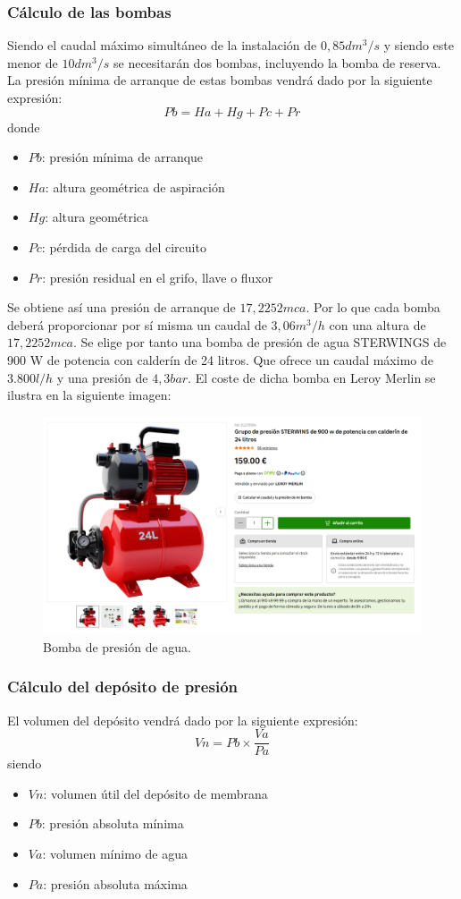 \documentclass[../main.tex]{subfiles}
\begin{document}
\subsubsection{Cálculo de las bombas}
Siendo el caudal máximo simultáneo de la instalación de $0,85 dm^3/s$ y siendo este menor de $10 dm^3/s$ se necesitarán dos bombas, incluyendo la bomba de reserva. La presión mínima de arranque de estas bombas vendrá dado por la siguiente expresión:
\[Pb = Ha + Hg + Pc + Pr\]
donde
\begin{itemize}
    \item $Pb$: presión mínima de arranque
    \item $Ha$: altura geométrica de aspiración
    \item $Hg$: altura geométrica
    \item $Pc$: pérdida de carga del circuito 
    \item $Pr$: presión residual en el grifo, llave o fluxor
\end{itemize}
Se obtiene así una presión de arranque de $17,2252 mca$. Por lo que cada bomba deberá proporcionar por sí misma un caudal de $3,06 m^3/h$ con una altura de $17,2252 mca$. Se elige por tanto una bomba de presión de agua STERWINGS de 900 W de potencia con calderín de 24 litros. Que ofrece un caudal máximo de $3.800 l/h$ y una presión de $4,3 bar$. El coste de dicha bomba en Leroy Merlin se ilustra en la siguiente imagen:

\begin{figure}[H]
    \centering
    \includegraphics[width=0.5\linewidth]{Imagenes/BombaAgua.png}
    \caption{Bomba de presión de agua.}
\end{figure}

\subsubsection{Cálculo del depósito de presión}
El volumen del depósito vendrá dado por la siguiente expresión:
\[Vn = Pb \times \frac{Va}{Pa}\]
siendo
\begin{itemize}
    \item $Vn$: volumen útil del depósito de membrana
    \item $Pb$: presión absoluta mínima
    \item $Va$: volumen mínimo de agua
    \item $Pa$: presión absoluta máxima
\end{itemize}
\end{document}
